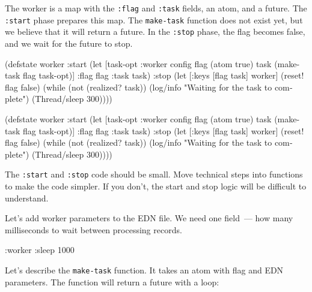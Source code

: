 \fi

The worker is a map with the \verb|:flag| and \verb|:task| fields, an atom, and a future. The \verb|:start| phase prepares this map. The \verb|make-task| function does not exist yet, but we believe that it will return a future. In the \verb|:stop| phase, the flag becomes false, and we wait for the future to stop.


\ifnarrow

\begin{english}
  \begin{clojure}
(defstate worker
  :start
  (let [{task-opt :worker} config
        flag (atom true)
        task (make-task flag task-opt)]
    {:flag flag :task task})
  :stop
  (let [{:keys [flag task]} worker]
    (reset! flag false)
    (while (not (realized? task))
      (log/info
      "Waiting for the task
                to complete")
      (Thread/sleep 300))))
  \end{clojure}
\end{english}

\else

\begin{english}
  \begin{clojure}
(defstate worker
  :start
  (let [{task-opt :worker} config
        flag (atom true)
        task (make-task flag task-opt)]
    {:flag flag :task task})
  :stop
  (let [{:keys [flag task]} worker]
    (reset! flag false)
    (while (not (realized? task))
      (log/info "Waiting for the task to complete")
      (Thread/sleep 300))))
  \end{clojure}
\end{english}

\fi

The \verb|:start| and \verb|:stop| code should be small. Move technical steps into functions to make the code simpler. If you don't, the start and stop logic will be difficult to understand.

Let's add worker parameters to the EDN file. We need one field~--- how many milliseconds to wait between processing records.

\begin{english}
  \begin{clojure}
{:worker {:sleep 1000}}
  \end{clojure}
\end{english}


Let's describe the \verb|make-task| function. It takes an atom with flag and EDN parameters. The function will return a future with a loop:

